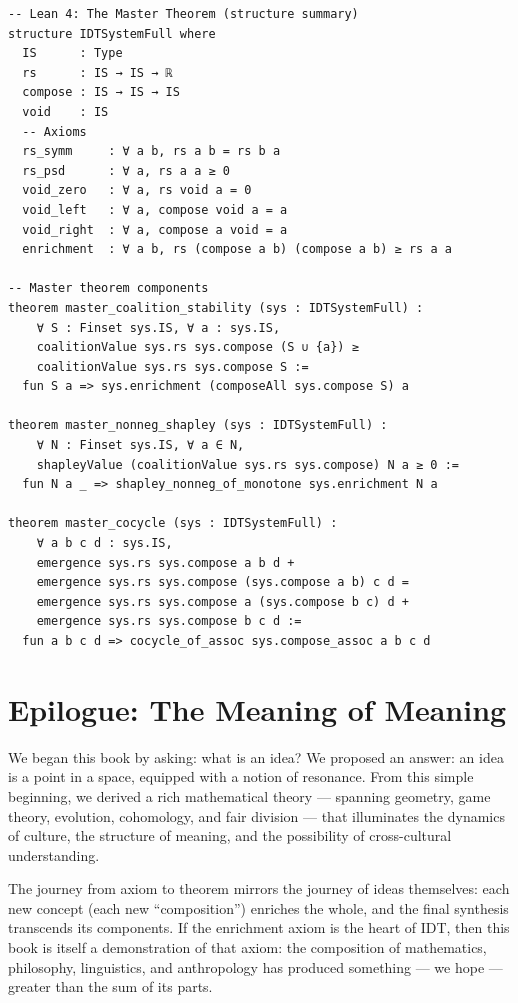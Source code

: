 \begin{lstlisting}
-- Lean 4: The Master Theorem (structure summary)
structure IDTSystemFull where
  IS      : Type
  rs      : IS → IS → ℝ
  compose : IS → IS → IS
  void    : IS
  -- Axioms
  rs_symm     : ∀ a b, rs a b = rs b a
  rs_psd      : ∀ a, rs a a ≥ 0
  void_zero   : ∀ a, rs void a = 0
  void_left   : ∀ a, compose void a = a
  void_right  : ∀ a, compose a void = a
  enrichment  : ∀ a b, rs (compose a b) (compose a b) ≥ rs a a

-- Master theorem components
theorem master_coalition_stability (sys : IDTSystemFull) :
    ∀ S : Finset sys.IS, ∀ a : sys.IS,
    coalitionValue sys.rs sys.compose (S ∪ {a}) ≥
    coalitionValue sys.rs sys.compose S :=
  fun S a => sys.enrichment (composeAll sys.compose S) a

theorem master_nonneg_shapley (sys : IDTSystemFull) :
    ∀ N : Finset sys.IS, ∀ a ∈ N,
    shapleyValue (coalitionValue sys.rs sys.compose) N a ≥ 0 :=
  fun N a _ => shapley_nonneg_of_monotone sys.enrichment N a

theorem master_cocycle (sys : IDTSystemFull) :
    ∀ a b c d : sys.IS,
    emergence sys.rs sys.compose a b d +
    emergence sys.rs sys.compose (sys.compose a b) c d =
    emergence sys.rs sys.compose a (sys.compose b c) d +
    emergence sys.rs sys.compose b c d :=
  fun a b c d => cocycle_of_assoc sys.compose_assoc a b c d
\end{lstlisting}

\section{Epilogue: The Meaning of Meaning}

We began this book by asking: what is an idea?  We proposed an answer:
an idea is a point in a space, equipped with a notion of resonance.
From this simple beginning, we derived a rich mathematical theory ---
spanning geometry, game theory, evolution, cohomology, and fair division
--- that illuminates the dynamics of culture, the structure of meaning,
and the possibility of cross-cultural understanding.

The journey from axiom to theorem mirrors the journey of ideas themselves:
each new concept (each new ``composition'') enriches the whole, and the
final synthesis transcends its components.  If the enrichment axiom is the
heart of IDT, then this book is itself a demonstration of that axiom:
the composition of mathematics, philosophy, linguistics, and anthropology
has produced something --- we hope --- greater than the sum of its parts.

